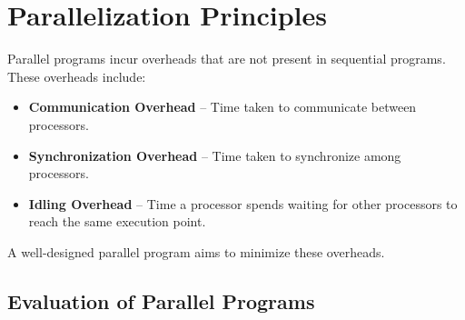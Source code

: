 \documentclass[12pt]{book}
\begin{document}
\chapter{Parallelization Principles}

Parallel programs incur overheads that are not present in sequential programs. These overheads include:
\begin{itemize}
    \item \textbf{Communication Overhead} – Time taken to communicate between processors.
    \item \textbf{Synchronization Overhead} – Time taken to synchronize among processors.
    \item \textbf{Idling Overhead} – Time a processor spends waiting for other processors to reach the same execution point.
\end{itemize}
A well-designed parallel program aims to minimize these overheads.

\section{Evaluation of Parallel Programs}
\end{document}
